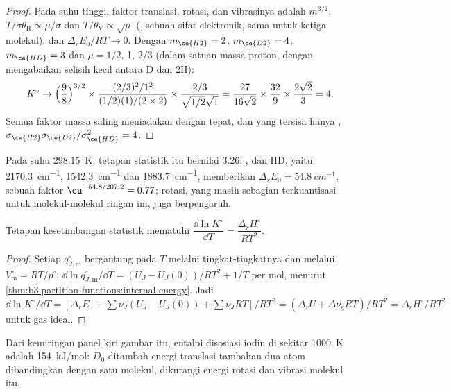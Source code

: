 \begin{proof}
Pada suhu tinggi, faktor translasi, rotasi, dan vibrasinya adalah $m^{3/2}$,
$T/\sigma\theta_{\mathrm R} \propto \mu/\sigma$ dan $T/\theta_{\mathrm V} \propto \sqrt\mu$ (, sebuah sifat elektronik, sama untuk ketiga molekul), dan
$\Delta_rE_0/RT \to 0$. Dengan $m_{\ce{H2}} = 2$, $m_{\ce{D2}} = 4$, $m_{\ce{HD}} = 3$ dan
$\mu = 1/2$, 1, $2/3$ (dalam satuan massa proton, dengan mengabaikan selisih
kecil antara D dan 2H):
\[
  K^\circ \to \Bigl(\frac{9}{8}\Bigr)^{3/2} \times \frac{(2/3)^2/1^2}{(1/2)(1)/(2 \times 2)}
  \times \frac{2/3}{\sqrt{1/2}\sqrt1}
  = \frac{27}{16\sqrt2} \times \frac{32}{9} \times \frac{2\sqrt2}{3} = 4 .
\]
Semua faktor massa saling meniadakan dengan tepat, dan yang tersisa hanya
, $\sigma_{\ce{H2}}
\sigma_{\ce{D2}}/\sigma_{\ce{HD}}^2 = 4$.
\end{proof}

Pada suhu \qty{298.15}{K}, tetapan statistik itu bernilai 3.26:  ,
 dan HD, yaitu \qty{2170.3}{cm^{-1}}, \qty{1542.3}{cm^{-1}} dan \qty{1883.7}{cm^{-1}},
memberikan $\Delta_rE_0 =
\qty{54.8}{cm^{-1}}$, sebuah faktor $\eu^{-54.8/207.2} = 0.77$; rotasi, yang masih
sebagian terkuantisasi untuk molekul-molekul ringan ini, juga berpengaruh.

\begin{proposition}\label{prop:b3:statistical-thermo-applied:vant-hoff-stat}
Tetapan kesetimbangan statistik mematuhi $\dfrac{\dd\ln K^\circ}{\dd T} = \dfrac{\Delta_rH^\circ}{RT^2}$.
\end{proposition}

\begin{proof}
Setiap $q^\circ_{J,\mathrm m}$ bergantung pada $T$ melalui tingkat-tingkatnya dan
melalui $V^\circ_{\mathrm m} = RT/p^\circ$:
$\dd\ln q^\circ_{J,\mathrm m}/\dd T = (U_J - U_J(0))/RT^2 + 1/T$ per mol, menurut
\cref{thm:b3:partition-functions:internal-energy}. Jadi $\dd\ln K^\circ/\dd T =
[\Delta_rE_0 + \sum\nu_J(U_J - U_J(0)) + \sum\nu_JRT]/RT^2 = (\Delta_rU + \Delta\nu_{\mathrm g}RT)/RT^2 =
\Delta_rH^\circ/RT^2$ untuk gas ideal.
\end{proof}

Dari kemiringan panel kiri gambar itu, entalpi disosiasi iodin di sekitar
\qty{1000}{K} adalah \qty{154}{kJ/mol}: $D_0$ ditambah energi translasi
tambahan dua atom dibandingkan dengan satu molekul, dikurangi energi rotasi
dan vibrasi molekul itu.

